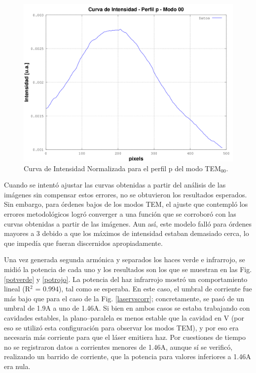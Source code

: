 \documentclass[10pt, a4paper]{article}%
\begin{document}
\begin{multicols}{2}
\begin{figure}[H]
    \centering    
    \includegraphics[scale=0.35]{Graficos/plt_int_tem00_perfil_p.png}
    \caption{Curva de Intensidad Normalizada para el perfil p del modo TEM$_{00}$.}
    \label{fig:int_modo_tem00}
\end{figure}



Cuando se intentó ajustar las curvas obtenidas a partir del análisis de las imágenes sin compensar estos errores, no se obtuvieron los resultados esperados. Sin embargo, para órdenes bajos de los modos TEM, el ajuste que contempló los errores metodológicos logró converger a una función que se corroboró con las curvas obtenidas a partir de las imágenes. Aun así, este modelo falló para órdenes mayores a 3 debido a que los máximos de intensidad estaban demasiado cerca, lo que impedía que fueran discernidos apropiadamente.

Una vez generada segunda armónica y separados los haces verde e infrarrojo, se midió la potencia de cada uno y los resultados son los que se muestran en las Fig. \ref{potverde} y \ref{potrojo}. La potencia del haz infrarrojo mostró un comportamiento lineal (R$^2$ = 0.994), tal como se esperaba. En este caso, el umbral de corriente fue más bajo que para el caso de la Fig. \ref{laservscorr}; concretamente, se pasó de un umbral de 1.9A a uno de 1.46A. Si bien en ambos casos se estaba trabajando con cavidades estables, la plano--paralela es menos estable que la cavidad en V (por eso se utilizó esta configuración para observar los modos TEM), y por eso era necesaria más corriente para que el láser emitiera haz. Por cuestiones de tiempo no se registraron datos a corrientes menores de 1.46A, aunque sí se verificó, realizando un barrido de corriente, que la potencia para valores inferiores a 1.46A era nula. 


\end{multicols}
\end{document}
